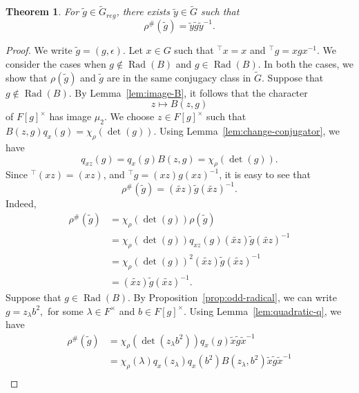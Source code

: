 \documentclass[11pt, a4paper, reqno]{amsart}
\newtheorem{theorem}{Theorem}[section]
\theoremstyle{definition}
\theoremstyle{remark}
\theoremstyle{example}
\theoremstyle{note}
\numberwithin{equation}{section}
\DeclareMathOperator{\Rad}{Rad}
\begin{document}
\begin{theorem}\label{thm:odd-conjugacy} For $\tilde{g}\in \widetilde{G}_{reg}$,  there exists $\tilde{y}\in\widetilde{G}$ such that 
\[\rho^{\#}(\tilde{g})=\tilde{y}\tilde{g}\tilde{y}^{-1}.
\]
\end{theorem}

\begin{proof} We write  $\tilde{g}=(g,\epsilon)$. Let $x\in G$ such that $^{\top}x=x$ and $^{\top}g=xgx^{-1}$. We consider the cases when $g\notin \Rad(B)$ and $g\in\Rad(B)$. In both the cases, we show that $\rho(\tilde{g})$ and $\tilde{g}$ are in the same conjugacy class in $\widetilde{G}$. Suppose that $g\notin\Rad(B)$. 
By Lemma~\ref{lem:image-B}, it follows that the character
\begin{equation*}
z\longmapsto B(z,g)
\end{equation*}
of $F[g]^{\times}$ has image $\mu_{2}$. We choose $z\in F[g]^{\times}$ such that $B(z,g)q_{x}(g)=\chi_{\rho}(\det(g))$. Using Lemma~\ref{lem:change-conjugator}, we have
\[
q_{xz}(g)=q_{x}(g)B(z,g)=\chi_{\rho}(\det(g)).
\]
Since $^{\top}(xz)=(xz)$, and $^{\top}g=(xz)g(xz)^{-1}$, it is easy to see that 
\[
\rho^{\#}(\tilde{g})
=(\widetilde{xz})\tilde{g}(\widetilde{xz})^{-1}.
\]
Indeed, 
\begin{align*}
\rho^{\#}(\tilde{g}) & = \chi_{\rho}(\det(g))\rho(\tilde{g}) \\
&= \chi_{\rho}(\det(g)) q_{xz}(g) (\widetilde{xz})\tilde{g}(\widetilde{xz})^{-1} \\
&= \chi_{\rho}(\det(g))^{2} (\widetilde{xz})\tilde{g}(\widetilde{xz})^{-1} \\
&= (\widetilde{xz})\tilde{g}(\widetilde{xz})^{-1}.
\end{align*}
Suppose that $g\in \Rad(B).$ By Proposition~\ref{prop:odd-radical}, we can write $g=z_{\lambda}b^{2},$ for some $\lambda\in F^{\times}$ and $b \in F[g]^{\times}.$ Using Lemma~\ref{lem:quadratic-q}, we have
\begin{align*}
\rho^{\#}(\tilde{g})
&=\chi_{\rho}(\det(z_{\lambda} b^{2}))q_{x}(g)\tilde{x}\tilde{g}\tilde{x}^{-1}\\
&=\chi_{\rho}(\lambda)q_{x}(z_{\lambda})q_{x}(b^{2})B(z_{\lambda},b^{2})\tilde{x}\tilde{g}\tilde{x}^{-1}\\

\end{align*}
\end{proof}
\end{document}
